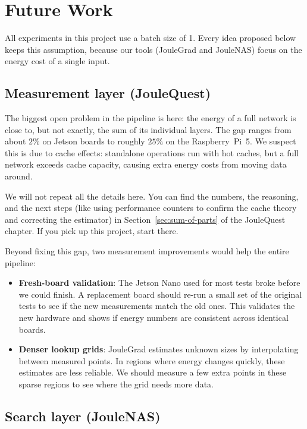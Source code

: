 \chapter{Future Work}
\label{chap:future_work}

All experiments in this project use a batch size of 1. Every idea proposed below keeps this assumption, because our tools (JouleGrad and JouleNAS) focus on the energy cost of a single input.

\section{Measurement layer (JouleQuest)}

The biggest open problem in the pipeline is here: the energy of a full network is close to, but not exactly, the sum of its individual layers. The gap ranges from about $2\%$ on Jetson boards to roughly $25\%$ on the Raspberry~Pi~5. We suspect this is due to cache effects: standalone operations run with hot caches, but a full network exceeds cache capacity, causing extra energy costs from moving data around.

We will not repeat all the details here. You can find the numbers, the reasoning, and the next steps (like using performance counters to confirm the cache theory and correcting the estimator) in Section~\ref{sec:sum-of-parts} of the JouleQuest chapter. If you pick up this project, start there.

Beyond fixing this gap, two measurement improvements would help the entire pipeline:

\begin{itemize}
    \item \textbf{Fresh-board validation}: The Jetson Nano used for most tests broke before we could finish. A replacement board should re-run a small set of the original tests to see if the new measurements match the old ones. This validates the new hardware and shows if energy numbers are consistent across identical boards.
    \item \textbf{Denser lookup grids}: JouleGrad estimates unknown sizes by interpolating between measured points. In regions where energy changes quickly, these estimates are less reliable. We should measure a few extra points in these sparse regions to see where the grid needs more data.
\end{itemize}

\section{Search layer (JouleNAS)}

